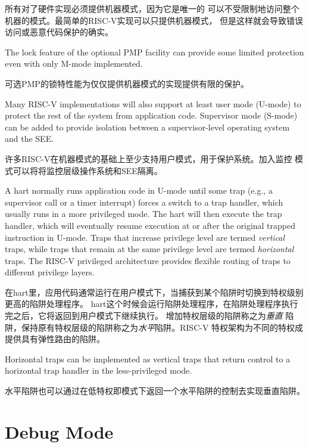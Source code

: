 所有对了硬件实现必须提供机器模式，因为它是唯一的
可以不受限制地访问整个机器的模式。最简单的RISC-V实现可以只提供机器模式，
但是这样就会导致错误访问或恶意代码保护的确实。

\begin{commentary}
  The lock feature of the optional PMP facility can provide some
  limited protection even with only M-mode implemented.
  
  可选PMP的锁特性能为仅仅提供机器模式的实现提供有限的保护。
\end{commentary}

Many RISC-V implementations will also support at least user mode
(U-mode) to protect the rest of the system from application code.
Supervisor mode (S-mode) can be added to provide isolation between a
supervisor-level operating system and the SEE.

许多RISC-V在机器模式的基础上至少支持用户模式，用于保护系统。加入监控
模式可以将将监控层级操作系统和SEE隔离。

A hart normally runs application code in U-mode until some trap (e.g.,
a supervisor call or a timer interrupt) forces a switch to a trap
handler, which usually runs in a more privileged mode. The hart will
then execute the trap handler, which will eventually resume execution
at or after the original trapped instruction in U-mode.  Traps that
increase privilege level are termed {\em vertical} traps, while traps
that remain at the same privilege level are termed {\em horizontal}
traps.  The RISC-V privileged architecture provides flexible routing
of traps to different privilege layers.

在hart里，应用代码通常运行在用户模式下，当捕获到某个陷阱时切换到特权级别更高的陷阱处理程序。
hart这个时候会运行陷阱处理程序，在陷阱处理程序执行完之后，它将返回到用户模式下继续执行。
增加特权层级的陷阱称之为{\em 垂直} 陷阱，保持原有特权层级的陷阱称之为{\em 水平}陷阱。RISC-V
特权架构为不同的特权成提供具有弹性路由的陷阱。

\begin{commentary}
Horizontal traps can be implemented as vertical traps that
return control to a horizontal trap handler in the less-privileged mode.

水平陷阱也可以通过在低特权即模式下返回一个水平陷阱的控制去实现垂直陷阱。
\end{commentary}

\section{Debug Mode}


